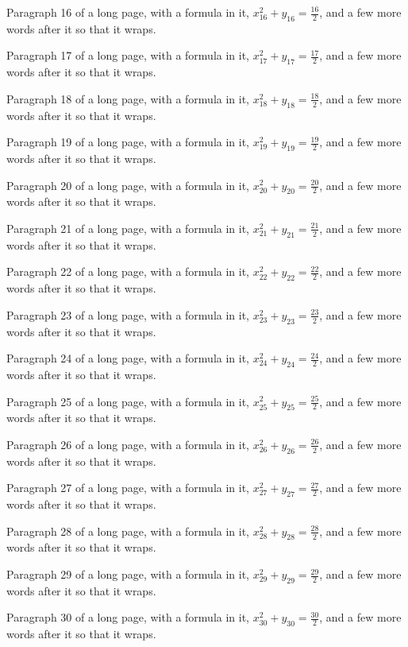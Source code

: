Paragraph 16 of a long page, with a formula in it, $x_{16}^2 + y_{16} = \frac{16}{2}$, and a few more words after it so that it wraps.

Paragraph 17 of a long page, with a formula in it, $x_{17}^2 + y_{17} = \frac{17}{2}$, and a few more words after it so that it wraps.

Paragraph 18 of a long page, with a formula in it, $x_{18}^2 + y_{18} = \frac{18}{2}$, and a few more words after it so that it wraps.

Paragraph 19 of a long page, with a formula in it, $x_{19}^2 + y_{19} = \frac{19}{2}$, and a few more words after it so that it wraps.

Paragraph 20 of a long page, with a formula in it, $x_{20}^2 + y_{20} = \frac{20}{2}$, and a few more words after it so that it wraps.

Paragraph 21 of a long page, with a formula in it, $x_{21}^2 + y_{21} = \frac{21}{2}$, and a few more words after it so that it wraps.

Paragraph 22 of a long page, with a formula in it, $x_{22}^2 + y_{22} = \frac{22}{2}$, and a few more words after it so that it wraps.

Paragraph 23 of a long page, with a formula in it, $x_{23}^2 + y_{23} = \frac{23}{2}$, and a few more words after it so that it wraps.

Paragraph 24 of a long page, with a formula in it, $x_{24}^2 + y_{24} = \frac{24}{2}$, and a few more words after it so that it wraps.

Paragraph 25 of a long page, with a formula in it, $x_{25}^2 + y_{25} = \frac{25}{2}$, and a few more words after it so that it wraps.

Paragraph 26 of a long page, with a formula in it, $x_{26}^2 + y_{26} = \frac{26}{2}$, and a few more words after it so that it wraps.

Paragraph 27 of a long page, with a formula in it, $x_{27}^2 + y_{27} = \frac{27}{2}$, and a few more words after it so that it wraps.

Paragraph 28 of a long page, with a formula in it, $x_{28}^2 + y_{28} = \frac{28}{2}$, and a few more words after it so that it wraps.

Paragraph 29 of a long page, with a formula in it, $x_{29}^2 + y_{29} = \frac{29}{2}$, and a few more words after it so that it wraps.

Paragraph 30 of a long page, with a formula in it, $x_{30}^2 + y_{30} = \frac{30}{2}$, and a few more words after it so that it wraps.

